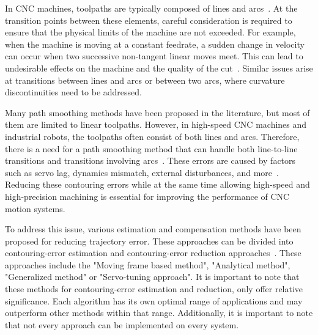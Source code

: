 In CNC machines, toolpaths are typically composed of lines and arcs~\cite{Liu.2020}. At the transition points between these elements, careful consideration is required to ensure that the physical limits of the machine are not exceeded. For example, when the machine is moving at a constant feedrate, a sudden change in velocity can occur when two successive non-tangent linear moves meet. This can lead to undesirable effects on the machine and the quality of the cut~\cite{Boujelbene.2004}. Similar issues arise at transitions between lines and arcs or between two arcs, where curvature discontinuities need to be addressed. 

Many path smoothing methods have been proposed in the literature, but most of them are limited to linear toolpaths. However, in high-speed CNC machines and industrial robots, the toolpaths often consist of both lines and arcs. Therefore, there is a need for a path smoothing method that can handle both line-to-line transitions and transitions involving arcs~\cite{Shahzadeh.2018}. These errors are caused by factors such as servo lag, dynamics mismatch, external disturbances, and more~\cite{Jia.2018}. Reducing these contouring errors while at the same time allowing high-speed and high-precision machining is essential for improving the performance of CNC motion systems. 

To address this issue, various estimation and compensation methods have been proposed for reducing trajectory error. These approaches can be divided into contouring-error estimation and contouring-error reduction approaches~\cite{Jia.2018}. These approaches include the "Moving frame based method", "Analytical method", "Generalized method" or "Servo-tuning approach". It is important to note that these methods for contouring-error estimation and reduction, only offer relative significance. Each algorithm has its own optimal range of applications and may outperform other methods within that range. Additionally, it is important to note that not every approach can be implemented on every system.





